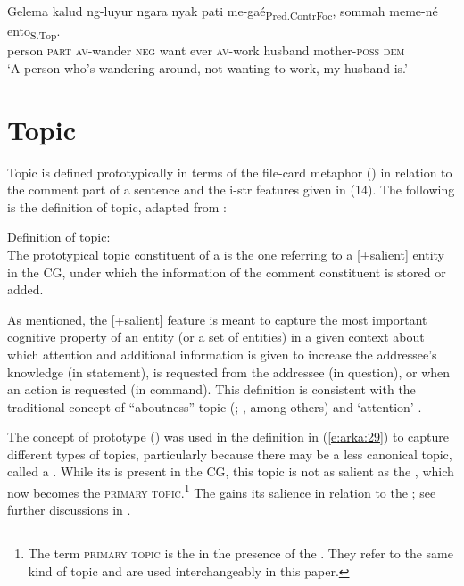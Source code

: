 \documentclass[output=paper
,modfonts
,nonflat]{langsci/langscibook}
\begin{document}
\begin{exe}
	\ex\label{e:arka:28}
	\gll {\ob}Gelema  kalud  ng-luyur  ngara   nyak  pati   me-gaé{\cb}\textsubscript{Pred.ContrFoc},  {\ob}sommah   meme-né     ento{\cb}\textsubscript{S.Top}.\\
	\phantom{[}person  \textsc{part}   \textsc{av-}wander  \textsc{neg}   want  ever \textsc{av}-work \phantom{[}husband mother-\textsc{poss}  \textsc{dem}\\
	\glt ‘A person who’s wandering around, not wanting to work, my husband is.’ 
\end{exe}

\section{\label{s:arka:5}Topic}

Topic is defined prototypically in terms of the file-card metaphor (\citealt{Reinhart1981,Erteschick-Shir2007,Krifka2012}) in relation to the comment part of a sentence and the i-str features given in (14). The following is the definition of topic, adapted from \citet[28]{Krifka2012}:

\begin{exe}
	\ex\label{e:arka:29}
	Definition of topic:\\
	The prototypical topic constituent of a  is the one referring to a [+salient] entity in the CG, under which the information of the comment constituent is stored or added.
\end{exe}

\noindent
As mentioned, the [+salient] feature is meant to capture the most important cognitive property of an entity (or a set of entities) in a given context about which attention and additional information is given to increase the addressee’s knowledge (in statement), is requested from the addressee (in question), or when an action is requested (in command). This definition is consistent with the traditional concept of “aboutness” topic (\citealt{Reinhart1981}; \citealt[210]{Gundel1988,Lambrecht1994}, among others) and ‘attention’ \citep[44]{Erteschick-Shir2007}. 

The concept of prototype (\citealt{Rosch1978,Taylor1991}) was used in the definition in (\ref{e:arka:29}) to capture different types of topics, particularly because there may be a less canonical topic, called a . While its  is present in the CG, this topic is not as salient as the , which now becomes the \textsc{primary topic}.\footnote{The term \textsc{primary topic} is the  in the presence of the . They refer to the same kind of topic and are used interchangeably in this paper.}  The  gains its salience in relation to the ; see further discussions in .
\end{document}
